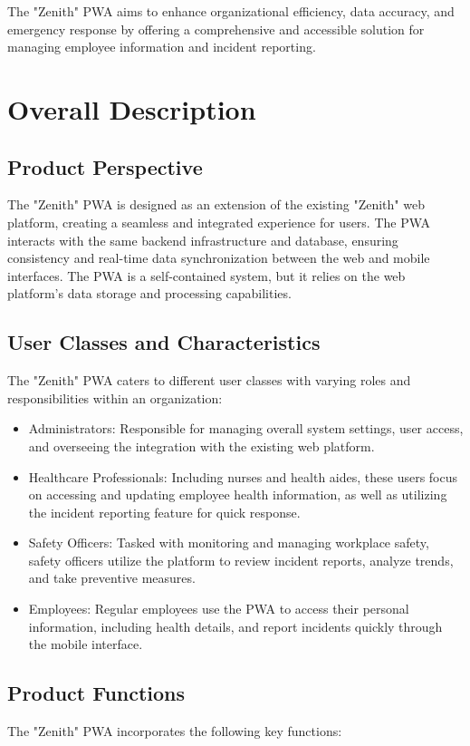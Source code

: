 \documentclass{scrreprt}
\begin{document}
The "Zenith" PWA aims to enhance organizational efficiency, data accuracy, and emergency response by offering a comprehensive and accessible solution for managing employee information and incident reporting.

\chapter{Overall Description}

\section{Product Perspective}
The "Zenith" PWA is designed as an extension of the existing "Zenith" web platform, creating a seamless and integrated experience for users. The PWA interacts with the same backend infrastructure and database, ensuring consistency and real-time data synchronization between the web and mobile interfaces. The PWA is a self-contained system, but it relies on the web platform's data storage and processing capabilities.

\section{User Classes and Characteristics}
The "Zenith" PWA caters to different user classes with varying roles and responsibilities within an organization:

\begin{itemize}
    \item Administrators: Responsible for managing overall system settings, user access, and overseeing the integration with the existing web platform.
    \item Healthcare Professionals: Including nurses and health aides, these users focus on accessing and updating employee health information, as well as utilizing the incident reporting feature for quick response.
    \item Safety Officers: Tasked with monitoring and managing workplace safety, safety officers utilize the platform to review incident reports, analyze trends, and take preventive measures.
    \item Employees: Regular employees use the PWA to access their personal information, including health details, and report incidents quickly through the mobile interface.
\end{itemize}

\section{Product Functions}
The "Zenith" PWA incorporates the following key functions:
\end{document}

